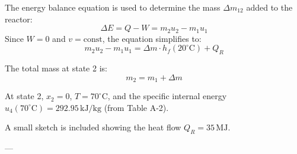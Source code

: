 The energy balance equation is used to determine the mass \( \Delta m_{12} \) added to the reactor:  
\[
\Delta E = Q - W = m_2 u_2 - m_1 u_1
\]  
Since \( W = 0 \) and \( v = \text{const} \), the equation simplifies to:  
\[
m_2 u_2 - m_1 u_1 = \Delta m \cdot h_f(20^\circ\text{C}) + Q_R
\]  

The total mass at state 2 is:  
\[
m_2 = m_1 + \Delta m
\]  

At state 2, \( x_2 = 0 \), \( T = 70^\circ\text{C} \), and the specific internal energy \( u_4(70^\circ\text{C}) = 292.95 \, \text{kJ/kg} \) (from Table A-2).  

A small sketch is included showing the heat flow \( Q_R = 35 \, \text{MJ} \).  

---